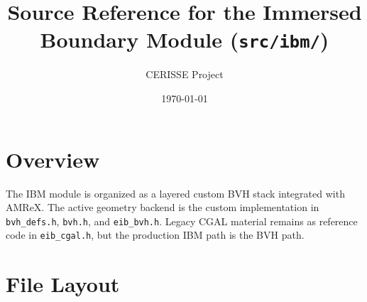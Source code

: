 \documentclass[11pt,a4paper]{article}
\title{\textbf{Source Reference for the Immersed Boundary Module (\texttt{src/ibm/})}}
\author{CERISSE Project}
\date{\today}
\begin{document}
\maketitle

\section{Overview}

The IBM module is organized as a layered custom BVH stack integrated with AMReX.
The active geometry backend is the custom implementation in \texttt{bvh\_defs.h},
\texttt{bvh.h}, and \texttt{eib\_bvh.h}. Legacy CGAL material remains as reference
code in \texttt{eib\_cgal.h}, but the production IBM path is the BVH path.

\section{File Layout}
\end{document}
